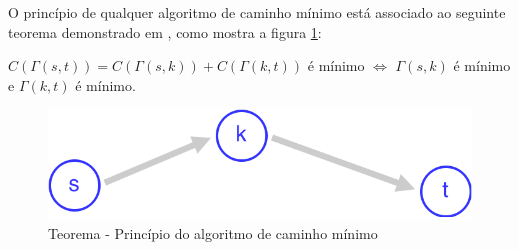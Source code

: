 O princípio de qualquer algoritmo de caminho mínimo está associado ao seguinte teorema demonstrado 
em \cite{negreirosbook}, como mostra a figura \ref{fig:teorema}:

$C(\Gamma(s,t)) = C(\Gamma(s,k)) + C(\Gamma(k,t))$ é mínimo $\Longleftrightarrow$ $\Gamma(s,k)$ é mínimo e $\Gamma(k,t)$ é mínimo.

\begin{figure}[htbp]
\centering
 \includegraphics[width=.45\textwidth]{chapters/fig/teorema.png}
\caption{Teorema - Princípio do algoritmo de caminho mínimo}
\label{fig:teorema}
\end{figure}
\FloatBarrier



